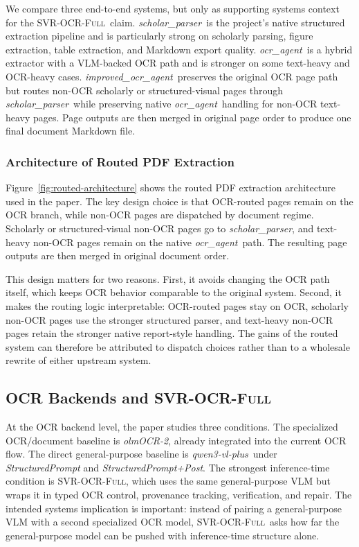 \documentclass[conference]{IEEEtran}
\newcommand{\papername}[1]{\textit{#1}}
\newcommand{\scholar}{\papername{scholar\_parser}}
\newcommand{\ocragent}{\papername{ocr\_agent}}
\newcommand{\improvedocr}{\papername{improved\_ocr\_agent}}
\newcommand{\svrocr}{\textsc{SVR-OCR-Full}}
\newcommand{\olmocr}{\papername{olmOCR-2}}
\newcommand{\qwen}{\papername{qwen3-vl-plus}}
\begin{document}
We compare three end-to-end systems, but only as supporting systems context for the \svrocr\ claim. \scholar\ is the project's native structured extraction pipeline and is particularly strong on scholarly parsing, figure extraction, table extraction, and Markdown export quality. \ocragent\ is a hybrid extractor with a VLM-backed OCR path and is stronger on some text-heavy and OCR-heavy cases. \improvedocr\ preserves the original OCR page path but routes non-OCR scholarly or structured-visual pages through \scholar\ while preserving native \ocragent\ handling for non-OCR text-heavy pages. Page outputs are then merged in original page order to produce one final document Markdown file.

\subsubsection{Architecture of Routed PDF Extraction}

Figure~\ref{fig:routed-architecture} shows the routed PDF extraction architecture used in the paper. The key design choice is that OCR-routed pages remain on the OCR branch, while non-OCR pages are dispatched by document regime. Scholarly or structured-visual non-OCR pages go to \scholar, and text-heavy non-OCR pages remain on the native \ocragent\ path. The resulting page outputs are then merged in original document order.

This design matters for two reasons. First, it avoids changing the OCR path itself, which keeps OCR behavior comparable to the original system. Second, it makes the routing logic interpretable: OCR-routed pages stay on OCR, scholarly non-OCR pages use the stronger structured parser, and text-heavy non-OCR pages retain the stronger native report-style handling. The gains of the routed system can therefore be attributed to dispatch choices rather than to a wholesale rewrite of either upstream system.

\subsection{OCR Backends and \svrocr}

At the OCR backend level, the paper studies three conditions. The specialized OCR/document baseline is \olmocr, already integrated into the current OCR flow. The direct general-purpose baseline is \qwen\ under \papername{StructuredPrompt} and \papername{StructuredPrompt+Post}. The strongest inference-time condition is \svrocr, which uses the same general-purpose VLM but wraps it in typed OCR control, provenance tracking, verification, and repair. The intended systems implication is important: instead of pairing a general-purpose VLM with a second specialized OCR model, \svrocr\ asks how far the general-purpose model can be pushed with inference-time structure alone.
\end{document}
